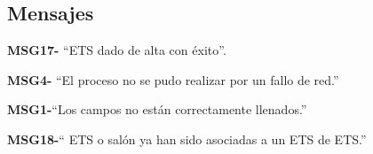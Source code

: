 \subsection{Mensajes}

\begin{Citemize}
    \item {\bf MSG17-} ``ETS  dado de alta con éxito''.
    \item {\bf MSG4-}  ``El proceso no se pudo realizar por un fallo de red.''
    \item {\bf MSG1-}{``Los campos no están correctamente llenados.''}
    \item {\bf MSG18-}{`` ETS o salón  ya han sido asociadas a un ETS de ETS.''}
    
\end{Citemize}

